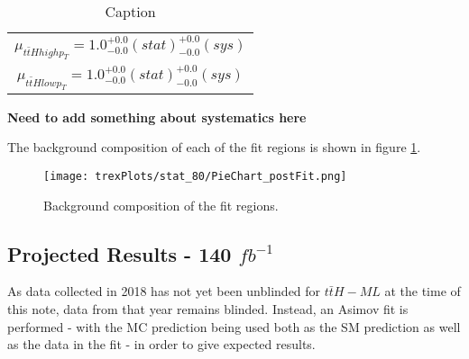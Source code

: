 \begin{table}[H]                                                                                                             
  \centering                                                                                                              
  \begin{tabular}{c}                                                                                            
     $\mu_{t\bar{t}H high p_T} = 1.0^{+0.0}_{-0.0}(stat)^{+0.0}_{-0.0}(sys)$ \\       
     $\mu_{t\bar{t}H low p_T} = 1.0^{+0.0}_{-0.0}(stat)^{+0.0}_{-0.0}(sys)$ \\
  \end{tabular}                                                                                                            
  \caption{Caption}                                                                                                        
  \label{tab:mu80}                                                                                                  
\end{table}  

\textbf{Need to add something about systematics here}

The background composition of each of the fit regions is shown in figure \ref{fig:pieChart80}.

\begin{figure}[h!]
    \centering
    \texttt{[image: trexPlots/stat\_80/PieChart\_postFit.png]}
    \caption{Background composition of the fit regions.}
    \label{fig:pieChart80}
\end{figure} 


\subsection{Projected Results - 140 $fb^{-1}$}   
\label{sec:res140}

As data collected in 2018 has not yet been unblinded for $t\bar{t}H-ML$ at the time of this note, data from that year remains blinded. Instead, an Asimov fit is performed - with the MC prediction being used both as the SM prediction as well as the data in the fit - in order to give expected results.

